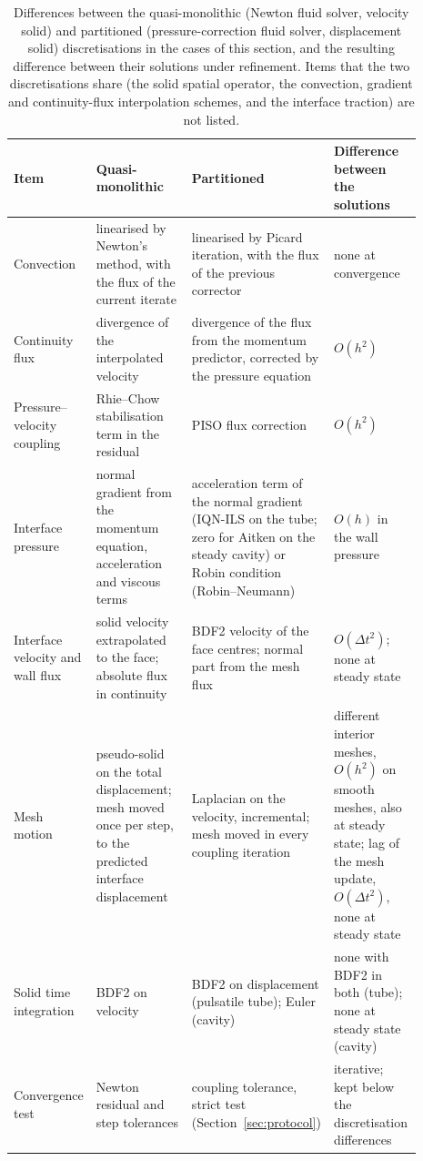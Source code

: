 \begin{table}[htbp]
	\centering
	\footnotesize
	\setlength{\tabcolsep}{3pt}
	\renewcommand{\arraystretch}{1.25}
	\caption{Differences between the quasi-monolithic (Newton fluid solver, velocity solid) and partitioned (pressure-correction fluid solver, displacement solid) discretisations in the cases of this section, and the resulting difference between their solutions under refinement. Items that the two discretisations share (the solid spatial operator, the convection, gradient and continuity-flux interpolation schemes, and the interface traction) are not listed.}
	\label{tab:discretisation_differences}
	\begin{tabular}{>{\raggedright\arraybackslash}p{0.15\linewidth}>{\raggedright\arraybackslash}p{0.26\linewidth}>{\raggedright\arraybackslash}p{0.26\linewidth}>{\raggedright\arraybackslash}p{0.22\linewidth}}
		\toprule
		Item & Quasi-monolithic & Partitioned & Difference between the solutions \\
		\midrule
		Convection & linearised by Newton's method, with the flux of the current iterate & linearised by Picard iteration, with the flux of the previous corrector & none at convergence \\
		\addlinespace
		Continuity flux & divergence of the interpolated velocity & divergence of the flux from the momentum predictor, corrected by the pressure equation & $O(h^2)$ \\
		\addlinespace
		Pressure--velocity coupling & Rhie--Chow stabilisation term in the residual & PISO flux correction & $O(h^2)$ \\
		\addlinespace
		Interface pressure & normal gradient from the momentum equation, acceleration and viscous terms & acceleration term of the normal gradient (IQN-ILS on the tube; zero for Aitken on the steady cavity) or Robin condition (Robin--Neumann) & $O(h)$ in the wall pressure \\
		\addlinespace
		Interface velocity and wall flux & solid velocity extrapolated to the face; absolute flux in continuity & BDF2 velocity of the face centres; normal part from the mesh flux & $O(\Delta t^2)$; none at steady state \\
		\addlinespace
		Mesh motion & pseudo-solid on the total displacement; mesh moved once per step, to the predicted interface displacement & Laplacian on the velocity, incremental; mesh moved in every coupling iteration & different interior meshes, $O(h^2)$ on smooth meshes, also at steady state; lag of the mesh update, $O(\Delta t^2)$, none at steady state \\
		\addlinespace
		Solid time integration & BDF2 on velocity & BDF2 on displacement (pulsatile tube); Euler (cavity) & none with BDF2 in both (tube); none at steady state (cavity) \\
		\addlinespace
		Convergence test & Newton residual and step tolerances & coupling tolerance, strict test (Section~\ref{sec:protocol}) & iterative; kept below the discretisation differences \\
		\bottomrule
	\end{tabular}
\end{table}


